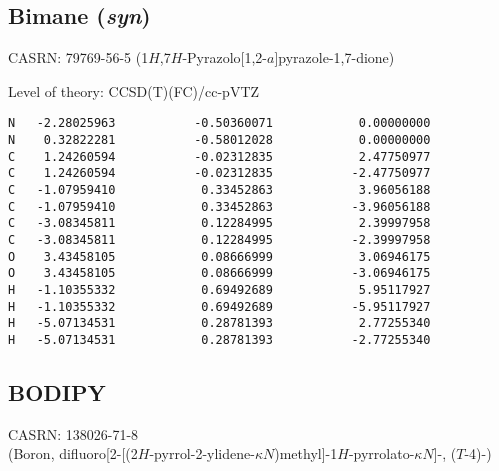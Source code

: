 \documentclass[journal=jctcce,manuscript=article,layout=traditional]{achemso}
\newcommand{\TZ}{cc-pVTZ}
\begin{document}
\subsection{Bimane (\emph{syn})}

CASRN: 79769-56-5 (1$H$,7$H$-Pyrazolo[1,2-$a$]pyrazole-1,7-dione)

\begin{singlespace}
\noindent  Level of theory: CCSD(T)(FC)/{\TZ}
\begin{verbatim}
N   -2.28025963           -0.50360071            0.00000000 
N    0.32822281           -0.58012028            0.00000000 
C    1.24260594           -0.02312835            2.47750977 
C    1.24260594           -0.02312835           -2.47750977 
C   -1.07959410            0.33452863            3.96056188 
C   -1.07959410            0.33452863           -3.96056188 
C   -3.08345811            0.12284995            2.39997958 
C   -3.08345811            0.12284995           -2.39997958 
O    3.43458105            0.08666999            3.06946175 
O    3.43458105            0.08666999           -3.06946175 
H   -1.10355332            0.69492689            5.95117927 
H   -1.10355332            0.69492689           -5.95117927 
H   -5.07134531            0.28781393            2.77255340 
H   -5.07134531            0.28781393           -2.77255340 
\end{verbatim}
\end{singlespace}


\subsection{BODIPY}

CASRN: 138026-71-8\\ (Boron, difluoro[2-[(2$H$-pyrrol-2-ylidene-$\kappa$$N$)methyl]-1$H$-pyrrolato-$\kappa$$N$]-, ($T$-4)-)
\end{document}
